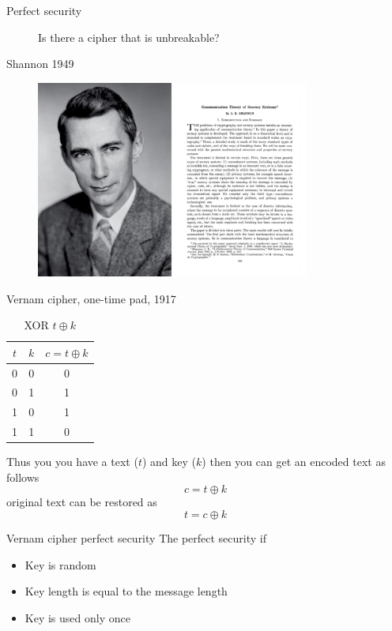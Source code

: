 \documentclass[10pt,pdf,hyperref={unicode}]{beamer}
\begin{document}
\begin{frame}{Perfect security}
 \begin{figure} 
   Is there a cipher that is unbreakable?
 \end{figure}
\end{frame}

\begin{frame}{Shannon 1949}
 \begin{figure} 
   \includegraphics[width=90mm,scale=0.5]{shannon.png}
 \end{figure}
\end{frame}

\begin{frame}{Vernam cipher, one-time pad, 1917}
  \begin{table}
    \centering
    \begin{tabular}{|c|c|c|}
      \hline
      $t$ & $k$ & $c = t \oplus k$ \\ \hline
      0  & 0 & 0 \\
      0  & 1 & 1 \\
      1  & 0 & 1 \\
      1  & 1 & 0 \\ \hline
    \end{tabular}
    \caption{XOR $t \oplus k$}
    \label{tblXOR}
  \end{table}
  Thus you you have a text ($t$) and key ($k$) then you can get an
  encoded text as follows
  \[
  c = t \oplus k
  \]
  original text can be restored as
  \[
  t = c \oplus k
  \]  
\end{frame}

\begin{frame}{Vernam cipher perfect security}
  The perfect security if
  \begin{itemize}
  \item Key is random
  \item Key length is equal to the message length
  \item Key is used only once
  \end{itemize}
\end{frame}
\end{document}
